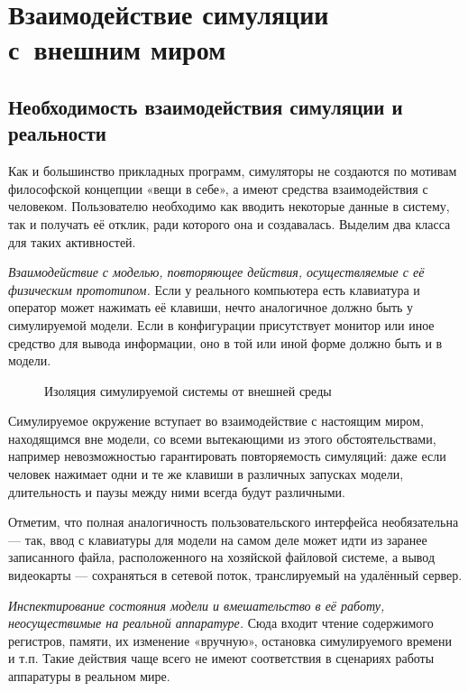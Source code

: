 \chapter{Взаимодействие симуляции с~внешним миром}\label{paravirt}


\section[Необходимость взаимодействия]{Необходимость взаимодействия симуляции и реальности}

Как и большинство прикладных программ, симуляторы не создаются по мотивам философской концепции «вещи в себе», а имеют средства взаимодействия с человеком. Пользователю необходимо как вводить некоторые данные в систему, так и получать её отклик, ради которого она и создавалась. Выделим два класса для таких активностей.

\begin{enumerate*}
\item \textit{Взаимодействие с моделью, повторяющее действия, осуществляемые с её физическим прототипом.} Если у реального компьютера есть клавиатура и оператор может нажимать её клавиши, нечто аналогичное должно быть у симулируемой модели. Если в конфигурации присутствует монитор или иное средство для вывода информации, оно в той или иной форме должно быть и в модели. 

\begin{figure}[htp]
    \centering
    \caption{Изоляция симулируемой системы от внешней среды}
    \label{fig:isolate}
\end{figure}

Симулируемое окружение вступает во взаимодействие с настоящим миром, находящимся вне модели, со всеми вытекающими из этого обстоятельствами, например невозможностью гарантировать повторяемость симуляций: даже если человек нажимает одни и те же клавиши в различных запусках модели, длительность и паузы между ними всегда будут различными.

Отметим, что полная аналогичность пользовательского интерфейса необязательна --- так, ввод с клавиатуры для модели на самом деле может идти из заранее записанного файла, расположенного на хозяйской файловой системе, а вывод видеокарты --- сохраняться в сетевой поток, транслируемый на удалённый сервер.

\item \textit{Инспектирование состояния модели и вмешательство в её работу, неосуществимые на реальной аппаратуре.} Сюда входит чтение содержимого регистров, памяти, их изменение «вручную», остановка симулируемого времени и т.п. Такие действия чаще всего не имеют соответствия в сценариях работы аппаратуры в реальном мире.
\end{enumerate*}

